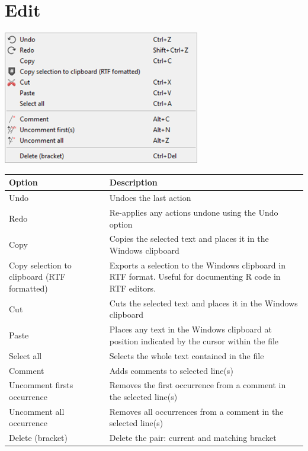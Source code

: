 
\hypertarget{menu_edit}{}
\section{Edit}

\includegraphics[scale=0.50]{./res/menu_edit.png}\\

\begin{scriptsize}
  \begin{tabularx}{\textwidth}{>{\hsize=0.4\hsize}X>{\hsize=0.7\hsize}X}\\
    \hline
    \textbf{Option} & \textbf{Description} \\
    \hline
    Undo & Undoes the last action \\
    Redo & Re-applies any actions undone using the Undo option \\
    Copy & Copies the selected text and places it in the Windows clipboard \\
    Copy selection to clipboard (RTF formatted) & Exports a selection to the Windows clipboard in RTF format.
     Useful for documenting R code in RTF editors. \\
    Cut & Cuts the selected text and places it in the Windows clipboard \\
    Paste & Places any text in the Windows clipboard at position indicated by the cursor within the file \\
    Select all & Selects the whole text contained in the file \\
    \hdashline[1pt/1pt]
    Comment & Adds comments to selected line(s) \\
    Uncomment firsts occurrence & Removes the first occurrence from a comment in the selected line(s) \\
    Uncomment all occurrence & Removes all occurrences from a comment in the selected line(s) \\
    \hdashline[1pt/1pt]
    Delete (bracket) & Delete the pair: current and matching bracket \\
    \hline
  \end{tabularx}
\end{scriptsize}
